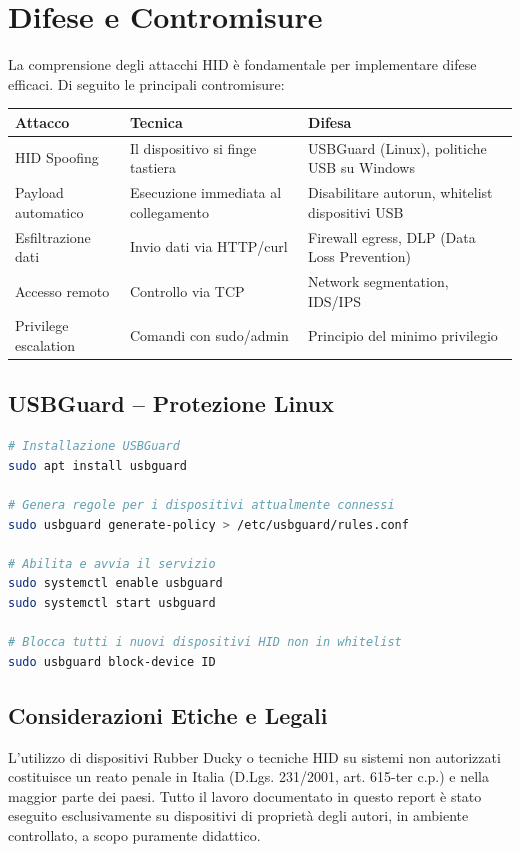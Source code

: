 \documentclass[12pt,a4paper]{article}
\begin{document}
\section{Difese e Contromisure}

La comprensione degli attacchi HID è fondamentale per implementare
difese efficaci. Di seguito le principali contromisure:

\begin{center}
\begin{tabular}{|p{4cm}|p{5cm}|p{5cm}|}
\hline
\textbf{Attacco} & \textbf{Tecnica} & \textbf{Difesa} \\
\hline
HID Spoofing & Il dispositivo si finge tastiera & USBGuard (Linux), politiche USB su Windows \\
\hline
Payload automatico & Esecuzione immediata al collegamento & Disabilitare autorun, whitelist dispositivi USB \\
\hline
Esfiltrazione dati & Invio dati via HTTP/curl & Firewall egress, DLP (Data Loss Prevention) \\
\hline
Accesso remoto & Controllo via TCP & Network segmentation, IDS/IPS \\
\hline
Privilege escalation & Comandi con sudo/admin & Principio del minimo privilegio \\
\hline
\end{tabular}
\end{center}

\subsection{USBGuard -- Protezione Linux}
\begin{lstlisting}[language=bash, caption=Configurazione USBGuard per bloccare dispositivi HID non autorizzati]
# Installazione USBGuard
sudo apt install usbguard

# Genera regole per i dispositivi attualmente connessi
sudo usbguard generate-policy > /etc/usbguard/rules.conf

# Abilita e avvia il servizio
sudo systemctl enable usbguard
sudo systemctl start usbguard

# Blocca tutti i nuovi dispositivi HID non in whitelist
sudo usbguard block-device ID
\end{lstlisting}

\subsection{Considerazioni Etiche e Legali}
L'utilizzo di dispositivi Rubber Ducky o tecniche HID su sistemi non autorizzati
costituisce un reato penale in Italia (D.Lgs. 231/2001, art. 615-ter c.p.) e nella
maggior parte dei paesi. Tutto il lavoro documentato in questo report è stato
eseguito esclusivamente su dispositivi di proprietà degli autori, in ambiente
controllato, a scopo puramente didattico.
\end{document}
